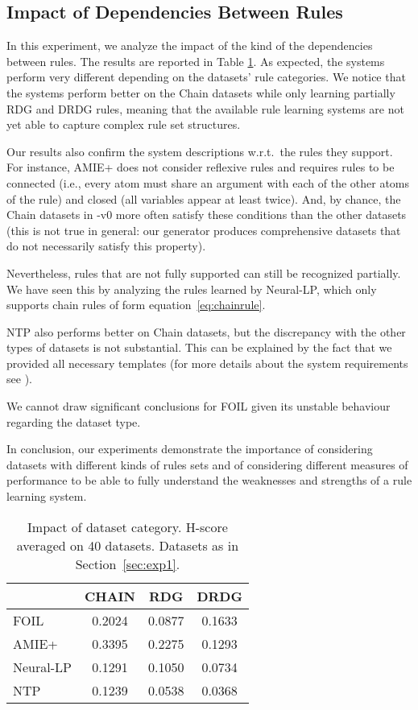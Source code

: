 \documentclass[letterpaper]{article} \usepackage{aaai20}  \usepackage{times}  \usepackage{helvet} \usepackage{courier}  \usepackage[hyphens]{url}  \usepackage{graphicx} \urlstyle{rm} \def\UrlFont{\rm}  \usepackage{graphicx}  \frenchspacing  \setlength{\pdfpagewidth}{8.5in}  \setlength{\pdfpageheight}{11in}  \usepackage{amsthm}
\theoremstyle{definition}
\def\eqref#1{equation~\ref{#1}}
\newcommand{\tool}{\text{RuDaS}\xspace}
\begin{document}
\subsection{Impact of Dependencies Between Rules}\label{sec:rule-dep-exps}
In this experiment, we analyze the impact of the kind of the dependencies between rules.
The results are reported in Table \ref{tab:result_3}. As expected, the systems perform very different depending on the datasets' rule categories. We notice that the systems perform better on the Chain datasets while only learning partially RDG and DRDG rules, meaning that the available rule learning systems are not yet able to capture complex rule set structures.


Our results also confirm the system descriptions w.r.t.\ the rules they support. For instance, AMIE+ does not consider reflexive rules and requires rules to be connected (i.e., every atom must share an argument with each of the other atoms of the rule) and closed (all variables appear at least twice).
And, by chance, the Chain datasets in \tool-v0 more often satisfy these conditions than the other datasets (this is not true in general: our generator produces comprehensive datasets that do not necessarily satisfy this property).

Nevertheless, rules that are not fully supported can still be recognized partially. We have seen this by analyzing the rules learned by Neural-LP, which only supports chain rules of form \eqref{eq:chainrule}.


NTP also performs better on Chain datasets, but the discrepancy with the other types of datasets is not substantial. This can be explained by the fact that we provided all necessary templates (for more details about the system requirements see \cite{RoR-NIPS17}). 

We cannot draw significant conclusions for FOIL given its unstable behaviour regarding the dataset type.

In conclusion, our experiments demonstrate the importance of considering datasets with different kinds of rules sets and of considering different measures of performance to be able to fully understand the weaknesses and strengths of a rule learning system.

\begin{table}[h!]
    \centering
\begin{tabular}{lccc}
    \toprule
& CHAIN &  RDG & DRDG  \\
     \midrule
     FOIL & 0.2024 &	0.0877 &	0.1633     \\
     AMIE+ &  0.3395 &	0.2275 &	0.1293 \\
     Neural-LP & 0.1291 &	0.1050 &	0.0734 \\
     NTP  & 0.1239 &	0.0538 &	0.0368  \\
     \bottomrule
    \end{tabular}
     \caption{Impact of dataset category. H-score averaged on 40 datasets. Datasets as in Section~\ref{sec:exp1}.
    }
    \label{tab:result_3}
\end{table}
\end{document}
